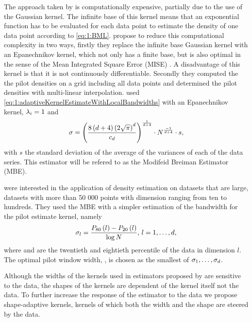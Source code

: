 The approach taken by \citeauthor{breiman1977variable} is computationally expensive, partially due to the use of the Gaussian kernel. The infinite base of this kernel means that an exponential function has to be evaluated for each data point to estimate the density of one data point according to \cref{eq:1:BML}. \textcite{wilkinson1995dataplot} propose to reduce this computational complexity in two ways, firstly they replace the infinite base Gaussian kernel with an Epanechnikov kernel, which not only has a finite base, but is also optimal in the sense of the Mean Integrated Square Error (MISE) \cite{epanechnikov1969non}. A disadvantage of this kernel is that it is not continuously differentiable. Secondly they computed the the pilot densities on a grid including all data points and determined the pilot densities with multi-linear interpolation. \citeauthor{wilkinson1995dataplot} used \cref{eq:1:adaptiveKernelEstimateWithLocalBandwidths} with an Epanechnikov kernel, $\lambda_{i} = 1$ and 
	\begin{equation}\label{eq:1:wilkinsonHOpt}
		\sigma = \left(\frac{8\left(d + 4\right)\left(2 \sqrt{\pi}\right)^d}{c_d}\right)^{\frac{1}{d + 4}}\cdot N^{\frac{-1}{d + 4}} \cdot s,
	\end{equation}
with $s$ the standard deviation of the average of the variances of each of the data series. This estimator will be refered to as the Modifeid Breiman Estimator (MBE). 

\textcite{ferdosi2011comparison} were interested in the application of density estimation on datasets that are large, \ie datasets with more than 50 000 points with dimension ranging from ten to hundreds. They used the MBE with a simpler estimation of the bandwidth for the pilot estimate kernel, namely 
	\begin{equation}
		\sigma_l = \frac{P_{80}\left( l \right) - P_{20}\left( l \right)}{\log N}, \, l = 1, \dotsc, d,
	\end{equation}
where  and  are the twentieth and eightieth percentile of the data in dimension $l$. 
The optimal pilot window width, \varBandwidth, is chosen as the smallest of $\sigma_1, \dotsc, \sigma_d$.

Although the widths of the kernels used in estimators proposed by \citeauthor{breiman1977variable,wilkinson1995dataplot} are sensitive to the data, the shapes of the kernels are dependent of the kernel itself not the data. To further increase the response of the estimator to the data we propose shape-adaptive kernels, kernels of which both the width and the shape are steered by the data. 

